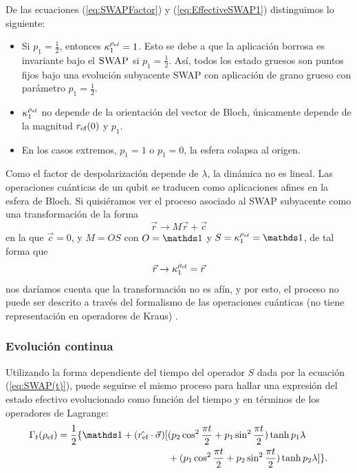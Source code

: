 De las ecuaciones (\ref{eq:SWAPFactor}) y (\ref{eq:EffectiveSWAP1}) distinguimos lo siguiente:
\begin{itemize}
  \item Si $p_{1}=\frac{1}{2}$, entonces $\kappa_{1}^{\rho_{\text{ef}}}=1$. Esto se debe a que la aplicación borrosa es invariante bajo el $\textsc{SWAP}$ si $p_{1}=\frac{1}{2}$. Así, todos los estado gruesos son puntos fijos bajo una evolución subyacente SWAP con aplicación de grano grueso con parámetro $p_{1}=\frac{1}{2}$.
  \item $\kappa_{1}^{\rho_{\text{ef}}}$ no depende de la orientación del vector de Bloch, únicamente depende de la magnitud $r_{\text{ef}}(0)$ y $p_{1}$.
  \item En los casos extremos, $p_{1}=1$ o $p_{1}=0$, la esfera colapsa al origen.
\end{itemize}


Como el factor de despolarización depende de $\lambda$, la dinámica no es lineal. Las operaciones cuánticas de un qubit se traducen como aplicaciones afines en la esfera de Bloch. Si quisiéramos ver el proceso asociado al \textsc{SWAP} subyacente como una transformación de la forma
\begin{equation}
  \vec{r}\rightarrow M\vec{r}+\vec{c}\nonumber
\end{equation}
en la que $\vec{c}=0$, y $M=OS$ con $O=\Id$ y $S=\kappa_{1}^{\rho_{\ef}}=\Id$, de tal forma que
\begin{equation}
  \vec{r}\rightarrow \kappa_{1}^{\rho_{\text{ef}}}=\vec{r}\nonumber
\end{equation}
nos daríamos cuenta que la transformación no es afín, y por esto, el proceso no puede ser descrito a través del formalismo de las operaciones cuánticas (no tiene representación en operadores de Kraus) \cite{Chuang}.

\subsubsection{Evolución continua}

Utilizando la forma dependiente del tiempo del operador $S$ dada por la ecuación (\ref{eq:SWAP(t)}), puede seguirse el mismo proceso para hallar una expresión del estado efectivo evolucionado como función del tiempo y en términos de los operadores de Lagrange:
\begin{align}
  \begin{split}
  \Gamma_{t}(\rho_{\ef})=\frac{1}{2}\{\Id+(\hat{r_{\ef}}\cdot\vec{\sigma})[&(p_{2}\cos^{2}{\frac{\pi t}{2}}+p_{1}\sin^{2}{\frac{\pi t}{2}})\tanh{p_{1}\lambda}\\
  &+(p_{1}\cos^{2}{\frac{\pi t}{2}}+p_{2}\sin^{2}{\frac{\pi t}{2}})\tanh{p_{2}\lambda}]\}.
  \end{split}
\end{align}

